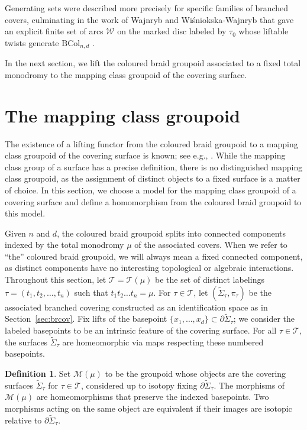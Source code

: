 \documentclass{amsart}
\theoremstyle{definition}
\newtheorem{definition}[theorem]{Definition}
\def\ws{\widetilde{\Sigma}}
\begin{document}
Generating sets were described more precisely for specific families of branched covers, culminating in the work of Wajnryb and Wi\'sniokska-Wajnryb that gave an explicit  finite set of arcs $\mathcal{W}$ on the marked disc labeled by $\tau_0$ whose liftable twists generate $\text{BCol}_{n,d}$ \cite{WWW}  \cite{WW1}.  



In the next section, we lift the coloured braid groupoid associated to a fixed total monodromy to the mapping class groupoid of the covering surface.  



\section{The mapping class groupoid}\label{sec:groupoids}

The existence of a lifting functor from the coloured braid groupoid to a mapping class groupoid of the covering surface is known; see e.g., \cite{Apol}.  While the mapping class group of a surface has a precise definition, there is no distinguished mapping class groupoid, as the assignment of distinct objects to a fixed surface is a matter of choice.   In this section, we choose a model for the mapping class groupoid of a covering surface and define a homomorphism from the coloured braid groupoid to this model.

Given $n$ and $d$, the coloured braid groupoid splits into connected components indexed by the total monodromy $\mu$ of the associated covers.  When we refer to ``the'' coloured braid groupoid, we will always mean a fixed connected component, as distinct components have no interesting topological or algebraic interactions. Throughout this section, let $\mathcal{T}=\mathcal{T}(\mu)$ be the set of distinct labelings $\tau=(t_1, t_2, \dots, t_n)$ such that $t_1t_2 \dots t_n=\mu$.  For $\tau\in \mathcal{T}$, let $(\ws_\tau, \pi_\tau)$ be the associated branched covering constructed as an identification space as in Section~\ref{sec:brcov}.  Fix lifts of the basepoint $\{x_1, \dots, x_d\}\subset \partial \ws_\tau$; we consider the labeled basepoints to be an intrinsic feature of the covering surface.  For all $\tau \in \mathcal{T}$, the surfaces $\ws_\tau$ are homeomorphic via maps respecting these numbered basepoints.





\begin{definition}\label{def:mcgoid} Set $\mathcal{M}(\mu)$ to be the groupoid whose objects are the covering surfaces $\ws_{\tau}$ for $\tau\in \mathcal{T}$, considered up to isotopy fixing $\partial \ws_{\tau}$. The morphisms of $\mathcal{M}(\mu)$ are homeomorphisms that preserve the indexed basepoints.  Two morphisms acting on the same object are equivalent if their images are isotopic relative to $\partial \ws_\tau$. 
\end{definition}
\end{document}
